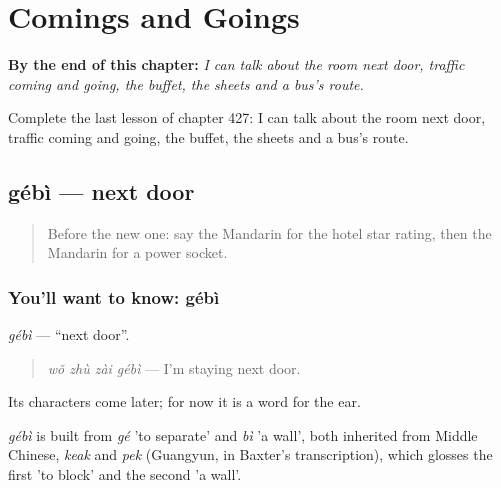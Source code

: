 
\chapter{Comings and Goings}
\label{ch:zh-comings-and-goings}

\begin{chapteropening}
\textbf{By the end of this chapter:} \emph{I can talk about the room next door, traffic coming and going, the buffet, the sheets and a bus's route.}

Complete the last lesson of chapter 427: I can talk about the room next door, traffic coming and going, the buffet, the sheets and a bus's route.
\end{chapteropening}

\section[gébì]{gébì — next door}

\label{lesson:ZH-C427-gebi}



\begin{quote}
Before the new one: say the Mandarin for the hotel star rating, then the Mandarin for a power socket.
\end{quote}

\subsection*{You'll want to know: gébì}
\emph{gébì} — \textquotedblleft{}next door\textquotedblright{}.

\begin{quote}
\emph{wǒ zhù zài gébì} — I'm staying next door.
\end{quote}

Its characters come later; for now it is a word for the ear.

\begin{cousinweb}
\emph{gébì} is built from \emph{gé} 'to separate' and \emph{bì} 'a wall', both inherited from Middle Chinese, \emph{keak} and \emph{pek} (Guangyun, in Baxter's transcription), which glosses the first 'to block' and the second 'a wall'.
\end{cousinweb}


